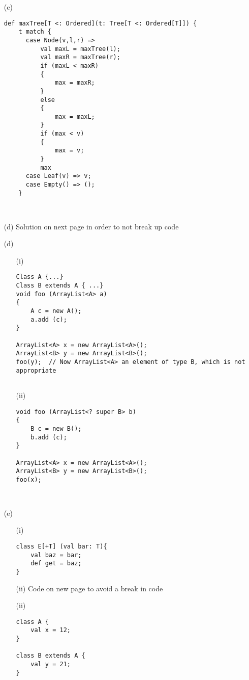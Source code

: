 \documentclass[11pt]{article}
\begin{document}
\begin{enumerate}
\begin{enumerate}
\item[(c)]
\begin{verbatim}
def maxTree[T <: Ordered](t: Tree[T <: Ordered[T]]) {
    t match {
      case Node(v,l,r) => 
          val maxL = maxTree(l);
          val maxR = maxTree(r);
          if (maxL < maxR)
          {
              max = maxR;
          }
          else
          {
              max = maxL;
          }
          if (max < v)
          {
              max = v;
          }
          max
      case Leaf(v) => v;
      case Empty() => ();
    }
    
    
\end{verbatim}
\item[(d)] Solution on next page in order to not break up code
\newpage
\item[(d)]
\begin{enumerate}
\item[(i)]
\begin{verbatim}
Class A {...}
Class B extends A { ...}
void foo (ArrayList<A> a)
{
    A c = new A();
    a.add (c);
}

ArrayList<A> x = new ArrayList<A>();
ArrayList<B> y = new ArrayList<B>();
foo(y);  // Now ArrayList<A> an element of type B, which is not appropriate


\end{verbatim}
\item[(ii)]
\begin{verbatim}
void foo (ArrayList<? super B> b)
{
    B c = new B();
    b.add (c);
}

ArrayList<A> x = new ArrayList<A>();
ArrayList<B> y = new ArrayList<B>();
foo(x);

 
\end{verbatim}
\end{enumerate}

\item[(e)]
\begin{enumerate}
\item[(i)] 
\begin{verbatim}
class E[+T] (val bar: T){
    val baz = bar;
    def get = baz; 
}

\end{verbatim}
\item[(ii)] Code on new page to avoid a break in code
\newpage
\item[(ii)]
\begin{verbatim}
class A {
    val x = 12;
}

class B extends A {
    val y = 21;
}


\end{verbatim}
\end{enumerate}
\end{enumerate}
\end{enumerate}
\end{document}
